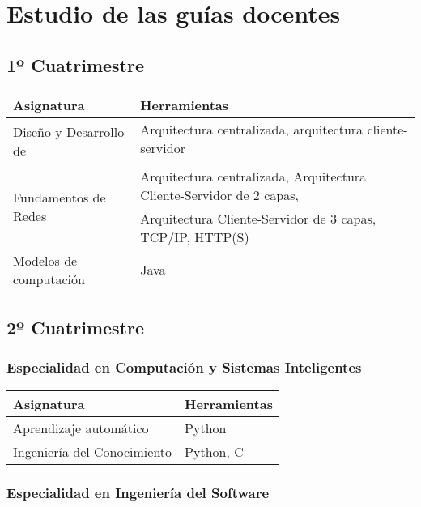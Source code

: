 \chapter{Estudio de las guías docentes}
\section{1º Cuatrimestre}

\begin{center}
	\begin{tabular}{l|l}
		\textbf{Asignatura}    & \textbf{Herramientas} \\ \hline
		\multirow{2}{*}{Diseño y Desarrollo de} & Arquitectura centralizada, arquitectura cliente-servidor \\
		Sistemas de Información & \\ \hline
		\multirow{2}{*}{Fundamentos de Redes} & Arquitectura centralizada, Arquitectura Cliente-Servidor de 2 capas,\\
		                                      & Arquitectura Cliente-Servidor de 3 capas, TCP/IP, HTTP(S)\\ \hline
		Modelos de computación & Java
	\end{tabular}
\end{center}

\section{2º Cuatrimestre}
\subsection{Especialidad en Computación y Sistemas Inteligentes}

\begin{center}
	\begin{tabular}{l|l}
		\textbf{Asignatura}         & \textbf{Herramientas} \\ \hline
		Aprendizaje automático      & Python \\ \hline
		Ingeniería del Conocimiento & Python, C \\  \hline
	\end{tabular}
\end{center}

\subsection{Especialidad en Ingeniería del Software}

